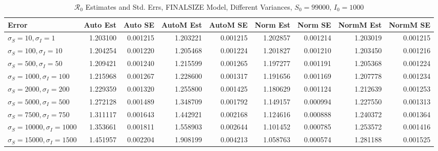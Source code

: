 \documentclass[12pt]{article}
\newcommand{\rr}{\ensuremath{\mathcal{R}_0}}
\begin{document}
\begin{table}[H]
	
	\caption{$\rr$ Estimates and Std. Errs, FINALSIZE Model, 
		Different Variances, $S_0 = 99000$, $I_0 = 1000$}
	\begin{footnotesize}
		\hskip -1.7cm
	\begin{tabular}{l|r|r|r|r|r|r|r|r}
		\hline
		Error & Auto Est & Auto SE & AutoM Est & AutoM SE & Norm Est & Norm SE & NormM Est & NormM SE\\
		\hline
		$\sigma_S = 10, \sigma_I = 1$ & 1.203100 & 0.001215 & 1.203221 & 0.001215 & 1.202857 & 0.001214 & 1.203019 & 0.001215\\
		\hline
		$\sigma_S = 100, \sigma_I = 10$ & 1.204254 & 0.001220 & 1.205468 & 0.001224 & 1.201827 & 0.001210 & 1.203450 & 0.001216\\
		\hline
		$\sigma_S = 500, \sigma_I = 50$ & 1.209421 & 0.001240 & 1.215599 & 0.001265 & 1.197277 & 0.001191 & 1.205368 & 0.001224\\
		\hline
		$\sigma_S = 1000, \sigma_I = 100$ & 1.215968 & 0.001267 & 1.228600 & 0.001317 & 1.191656 & 0.001169 & 1.207778 & 0.001234\\
		\hline
		$\sigma_S = 2000, \sigma_I = 200$ & 1.229359 & 0.001320 & 1.255800 & 0.001425 & 1.180629 & 0.001124 & 1.212639 & 0.001253\\
		\hline
		$\sigma_S = 5000, \sigma_I = 500$ & 1.272128 & 0.001489 & 1.348709 & 0.001792 & 1.149157 & 0.000994 & 1.227550 & 0.001313\\
		\hline
		$\sigma_S = 7500, \sigma_I = 750$ & 1.311117 & 0.001643 & 1.442921 & 0.002168 & 1.124616 & 0.000888 & 1.240372 & 0.001364\\
		\hline
		$\sigma_S = 10000, \sigma_I = 1000$ & 1.353661 & 0.001811 & 1.558903 & 0.002644 & 1.101452 & 0.000785 & 1.253572 & 0.001416\\
		\hline
		$\sigma_S = 15000, \sigma_I = 1500$ & 1.451957 & 0.002204 & 1.908199 & 0.004213 & 1.058763 & 0.000574 & 1.281188 & 0.001525\\
		\hline
	\end{tabular}
\end{footnotesize}
\end{table}
\end{document}
